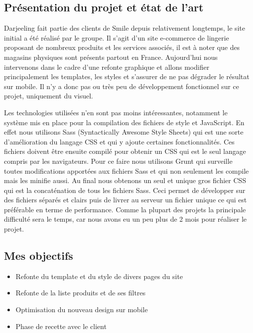 \documentclass[a4paper,11pt,twoside]{report}
\begin{document}
    \subsection*{Présentation du projet et état de l'art}
    Darjeeling fait partie des clients de Smile depuis relativement longtemps, le site initial a été réalisé par le groupe. Il s'agit d'un site e-commerce de lingerie proposant de nombreux produits et les services associés, il est à noter que des magasins physiques sont présents partout en France. Aujourd'hui nous intervenons dans le cadre d'une refonte graphique et allons modifier principalement les templates, les styles et s'assurer de ne pas dégrader le résultat sur mobile. Il n'y a donc pas ou très peu de développement fonctionnel sur ce projet, uniquement du visuel. 
    
    Les technologies utilisées n'en sont pas moins intéressantes, notamment le système mis en place pour la compilation des fichiers de style et JavaScript. En effet nous utilisons Sass (Syntactically Awesome Style Sheets) qui est une sorte d'amélioration du langage CSS et qui y ajoute certaines fonctionnalités. Ces fichiers doivent être ensuite compilé pour obtenir un CSS qui est le seul langage compris par les navigateurs. Pour ce faire nous utilisons Grunt qui surveille toutes modifications apportées aux fichiers Sass et qui non seulement les compile mais les minifie aussi. Au final nous obtenons un seul et unique gros fichier CSS qui est la concaténation de tous les fichiers Sass. Ceci permet de développer sur des fichiers séparés et clairs puis de livrer au serveur un fichier unique ce qui est préférable en terme de performance. Comme la plupart des projets la principale difficulté sera le temps, car nous avons eu un peu plus de 2 mois pour réaliser le projet.
    \subsection*{Mes objectifs}
      \begin{itemize}

	\item Refonte du template et du style de divers pages du site
	\item Refonte de la liste produits et de ses filtres
	\item Optimisation du nouveau design sur mobile
	\item Phase de recette avec le client

      \end{itemize}
\end{document}
